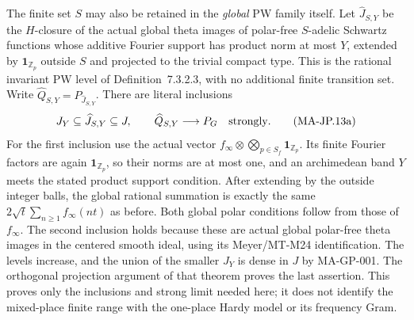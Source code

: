 The finite set $S$ may also be retained in the \emph{global}
PW family itself.  Let $\widehat J_{S,Y}$ be the $H$-closure
of the actual global theta images of polar-free
$S$-adelic Schwartz functions whose additive Fourier
support has product norm at most $Y$, extended by
$\mathbf1_{\mathbb Z_p}$ outside $S$ and projected to
the trivial compact type.  This is the rational invariant
PW level of Definition~7.3.2.3, with no additional
finite transition set.  Write
$\widehat Q_{S,Y}=P_{\widehat J_{S,Y}}$.
There are literal inclusions
\[
         J_Y\subseteq\widehat J_{S,Y}\subseteq J,
       \qquad \widehat Q_{S,Y}\longrightarrow P_G
                          \quad\hbox{strongly}.
 \tag{MA-JP.13a}
\]
For the first inclusion use the actual vector
$f_\infty\otimes\bigotimes_{p\in S_f}\mathbf1_{\mathbb Z_p}$.
Its finite Fourier factors are again
$\mathbf1_{\mathbb Z_p}$, so their norms are at most one,
and an archimedean band $Y$ meets the stated product
support condition.  After extending by the outside
integer balls, the global rational summation is exactly
the same $2\sqrt t\sum_{n\ge1}f_\infty(nt)$ as before.
Both global polar conditions follow from those of
$f_\infty$.  The second inclusion holds because these
are actual global polar-free theta images in the
centered smooth ideal, using its Meyer/MT-M24
identification.  The levels increase, and the union
of the smaller $J_Y$ is dense in $J$ by MA-GP-001.
The orthogonal projection argument of that theorem
proves the last assertion.  This proves only the
inclusions and strong limit needed here; it does not
identify the mixed-place finite range with the
one-place Hardy model or its frequency Gram.


